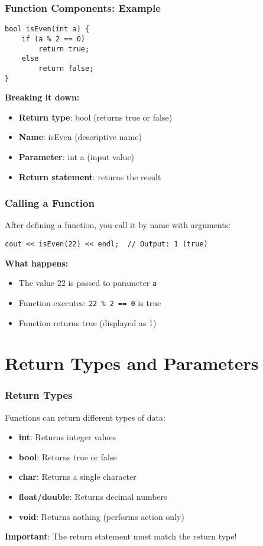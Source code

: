 \documentclass{beamer}
\begin{document}
\begin{frame}[fragile]
\frametitle{Function Components: Example}
\begin{verbatim}
bool isEven(int a) {
    if (a % 2 == 0)
        return true;
    else
        return false;
}
\end{verbatim}
\pause

\textbf{Breaking it down:}
\begin{itemize}
    \item \textbf{Return type}: bool (returns true or false)
    \item \textbf{Name}: isEven (descriptive name)
    \item \textbf{Parameter}: int a (input value)
    \item \textbf{Return statement}: returns the result
\end{itemize}
\end{frame}

\begin{frame}[fragile]
\frametitle{Calling a Function}
After defining a function, you call it by name with arguments:\pause

\begin{verbatim}
cout << isEven(22) << endl;  // Output: 1 (true)
\end{verbatim}
\pause

\textbf{What happens:}
\begin{itemize}
    \item The value 22 is passed to parameter \texttt{a}
    \item Function executes: \texttt{22 \% 2 == 0} is true
    \item Function returns true (displayed as 1)
\end{itemize}
\end{frame}

\section{Return Types and Parameters}

\begin{frame}
\frametitle{Return Types}
Functions can return different types of data:\pause

\begin{itemize}
    \item \textbf{int}: Returns integer values
    \item \textbf{bool}: Returns true or false
    \item \textbf{char}: Returns a single character
    \item \textbf{float/double}: Returns decimal numbers
    \item \textbf{void}: Returns nothing (performs action only)
\end{itemize}
\pause

\textbf{Important}: The return statement must match the return type!
\end{frame}
\end{document}
